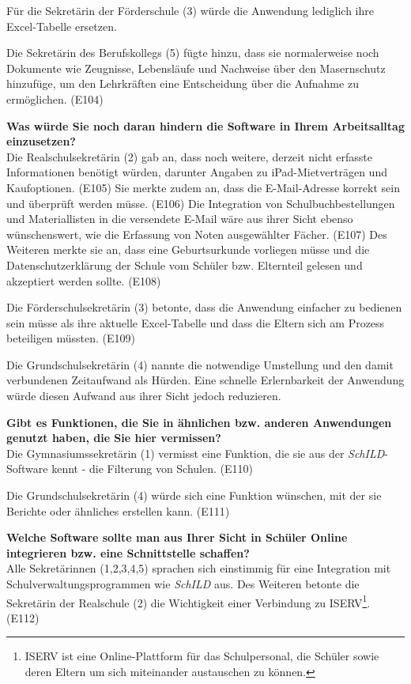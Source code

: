 Für die Sekretärin der Förderschule (3) würde die Anwendung lediglich ihre Excel-Tabelle ersetzen.

Die Sekretärin des Berufskollegs (5) fügte hinzu, dass sie normalerweise noch Dokumente wie Zeugnisse, Lebensläufe und Nachweise über den Masernschutz hinzufüge, um den Lehrkräften eine Entscheidung über die Aufnahme zu ermöglichen. (E104)

\textbf{Was würde Sie noch daran hindern die Software in Ihrem Arbeitsalltag einzusetzen?}\\
Die Realschulsekretärin (2) gab an, dass noch weitere, derzeit nicht erfasste Informationen benötigt würden, darunter Angaben zu iPad-Mietverträgen und Kaufoptionen. (E105) Sie merkte zudem an, dass die E-Mail-Adresse korrekt sein und überprüft werden müsse. (E106) Die Integration von Schulbuchbestellungen und Materiallisten in die versendete E-Mail wäre aus ihrer Sicht ebenso wünschenswert, wie die Erfassung von Noten ausgewählter Fächer. (E107) Des Weiteren merkte sie an, dass eine Geburtsurkunde vorliegen müsse und die Datenschutzerklärung der Schule vom Schüler bzw. Elternteil gelesen und akzeptiert werden sollte. (E108)

Die Förderschulsekretärin (3) betonte, dass die Anwendung einfacher zu bedienen sein müsse als ihre aktuelle Excel-Tabelle und dass die Eltern sich am Prozess beteiligen müssten. (E109)

Die Grundschulsekretärin (4) nannte die notwendige Umstellung und den damit verbundenen Zeitaufwand als Hürden. Eine schnelle Erlernbarkeit der Anwendung würde diesen Aufwand aus ihrer Sicht jedoch reduzieren. 

\textbf{Gibt es Funktionen, die Sie in ähnlichen bzw. anderen Anwendungen genutzt haben, die Sie hier vermissen?}\\
Die Gymnasiumssekretärin (1) vermisst eine Funktion, die sie aus der \textit{SchILD}-Software kennt - die Filterung von Schulen. (E110)

Die Grundschulsekretärin (4) würde sich eine Funktion wünschen, mit der sie Berichte oder ähnliches erstellen kann. (E111)

\textbf{Welche Software sollte man aus Ihrer Sicht in Schüler Online integrieren bzw. eine Schnittstelle schaffen?}\\
Alle Sekretärinnen (1,2,3,4,5) sprachen sich einstimmig für eine Integration mit Schulverwaltungsprogrammen wie \textit{SchILD} aus. Des Weiteren betonte die Sekretärin der Realschule (2) die Wichtigkeit einer Verbindung zu ISERV\footnote{ISERV ist eine Online-Plattform für das Schulpersonal, die Schüler sowie deren Eltern um sich miteinander austauschen zu können.}. (E112)

